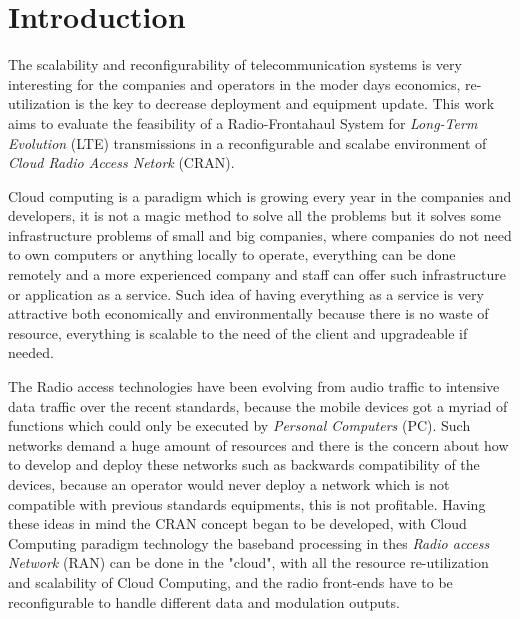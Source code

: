 \chapter{Introduction}
\label{chap:intro}


The scalability and reconfigurability of telecommunication systems is very
interesting for the companies and operators in the moder days economics,
re-utilization is the key to decrease deployment and equipment update. This work
aims to evaluate the feasibility of a Radio-Frontahaul System for
\textit{Long-Term Evolution} (LTE) transmissions in a reconfigurable and scalabe
environment of \textit{Cloud Radio Access Netork} (CRAN).

Cloud computing is a paradigm which is growing every year in the companies and
developers, it is not a magic method to solve all the problems but it solves
some infrastructure problems of small and big companies, where companies do
not need to own computers or anything locally to operate, everything can be done
remotely and a more experienced company and staff can offer such infrastructure
or application as a service. Such idea of having everything as a service is very
attractive both economically  and environmentally because there is no waste of
resource, everything is scalable to the need of the client and upgradeable if
needed.

The Radio access technologies have been evolving from audio traffic to intensive
data traffic over the recent standards, because the mobile devices got a myriad
of functions which could only be executed by \textit{Personal Computers} (PC).
Such networks demand a huge amount of resources and there is the concern about
how to develop and deploy these networks such as backwards compatibility of the
devices, because an operator would never deploy a network which is not
compatible with previous standards equipments, this is not profitable. Having
these ideas in mind the CRAN concept began to be developed, with Cloud Computing
paradigm technology the baseband processing in thes \textit{Radio access Network}
(RAN) can be done in the "cloud", with all the resource re-utilization and
scalability of Cloud Computing,  and the radio front-ends have to be
reconfigurable to handle different data and modulation outputs.

